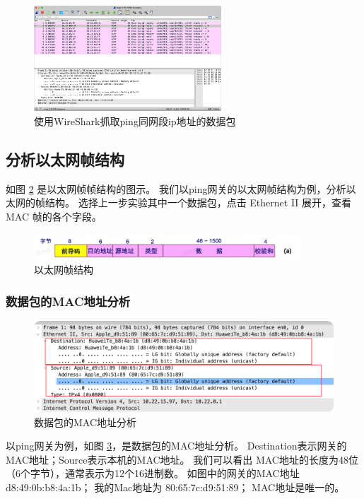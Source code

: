 \documentclass[a4paper,12pt]{report}
\begin{document}
\begin{spacing}{1.5}
\begin{figure}[htb!]
  \centering
\includegraphics[width=7cm]{figure/pingsamedetail.png}
\caption{使用WireShark抓取ping同网段ip地址的数据包}
\label{pic5}
\end{figure}

\subsection{分析以太网帧结构}
如图 \ref{pic6} 是以太网帧帧结构的图示。
我们以ping网关的以太网帧结构为例，分析以太网的帧结构。
选择上一步实验其中一个数据包，点击 Ethernet II 展开，查看 MAC 帧的各个字段。

\begin{figure}[htb!]
  \centering
\includegraphics[width=10cm]{figure/eth.png}
\caption{以太网帧结构}
\label{pic6}
\end{figure}

\subsubsection{数据包的MAC地址分析}

\begin{figure}[htb!]
  \centering
\includegraphics[width=13cm]{figure/macanalysis.png}
\caption{数据包的MAC地址分析}
\label{pic7}
\end{figure}

以ping⽹关为例，如图 \ref{pic7}，是数据包的MAC地址分析。
Destination表⽰⽹关的MAC地址；Source表⽰本机的MAC地址。
我们可以看出 MAC地址的长度为48位（6个字节），通常表⽰为12个16进制数。
如图中的⽹关的MAC地址 d8:49:0b:b8:4a:1b；
我的Mac地址为 80:65:7c:d9:51:89；
MAC地址是唯⼀的。


\end{spacing}
\end{document}
